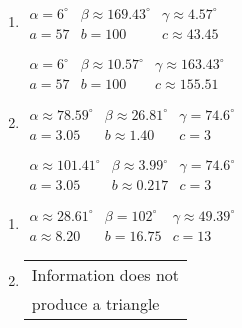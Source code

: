 \documentclass{ximera}
\begin{document}
\begin{multicols}{2} 

\begin{enumerate}

\setcounter{enumi}{\value{HW}}

\item $\begin{array}{lll}
\alpha = 6^{\circ} & \beta \approx 169.43^{\circ} & \gamma \approx 4.57^{\circ} \\
a = 57 & b = 100 & c \approx 43.45 \end{array}$

$\begin{array}{lll}
\alpha = 6^{\circ} & \beta \approx 10.57^{\circ} & \gamma \approx 163.43^{\circ} \\
a = 57 & b = 100 & c \approx 155.51 \end{array}$

\item $\begin{array}{lll}
\alpha \approx 78.59^{\circ} & \beta \approx 26.81^{\circ} & \gamma = 74.6^{\circ} \\
a = 3.05 & b \approx 1.40 & c = 3 \end{array}$

$\begin{array}{lll}
\alpha \approx 101.41^{\circ} & \beta \approx 3.99^{\circ} & \gamma = 74.6^{\circ} \\
a = 3.05 & b \approx 0.217 & c = 3 \end{array}$

\setcounter{HW}{\value{enumi}}

\end{enumerate}

\end{multicols}

\begin{multicols}{2} 

\begin{enumerate}

\setcounter{enumi}{\value{HW}}

\item $\begin{array}{lll}
\alpha \approx 28.61^{\circ} & \beta = 102^{\circ} & \gamma \approx 49.39^{\circ} \\
a \approx 8.20 & b = 16.75 & c = 13 \end{array}$

\item \begin{tabular}{l}
Information does not \\
produce a triangle \end{tabular}

\setcounter{HW}{\value{enumi}}

\end{enumerate}

\end{multicols}
\end{document}
